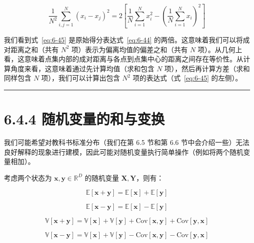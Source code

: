 \begin{equation}
\frac{1}{N^2} \sum_{i,j=1}^N (x_i - x_j)^2 = 2 \left[ \frac{1}{N} \sum_{i=1}^N x_i^2 - \left( \frac{1}{N} \sum_{i=1}^N x_i \right)^2 \right]
\tag{6.45}\label{eq:6-45}
\end{equation}

我们看到式~\eqref{eq:6-45} 是原始得分表达式~\eqref{eq:6-44} 的两倍。这意味着我们可以将成对距离之和（共有 $ N^2 $ 项）表示为偏离均值的偏差之和（共有 $ N $ 项）。从几何上看，这意味着点集内部的成对距离与各点到点集中心的距离之间存在等价性。从计算角度来看，这意味着通过先计算均值（求和包含 $ N $ 项），然后再计算方差（求和同样包含 $ N $ 项），我们可以计算出包含 $ N^2 $ 项的表达式（式~\eqref{eq:6-45} 的左侧）。

\medskip\hrule\medskip

\section*{6.4.4 随机变量的和与变换}

我们可能希望对教科书标准分布（我们在第 6.5 节和第 6.6 节中会介绍一些）无法良好解释的现象进行建模，因此可能对随机变量执行简单操作（例如将两个随机变量相加）。

考虑两个状态为 $ \boldsymbol{x}, \boldsymbol{y} \in \mathbb{R}^D $ 的随机变量 $ \boldsymbol{X}, \boldsymbol{Y} $，则有：

\begin{equation}
\mathbb{E}[\boldsymbol{x} + \boldsymbol{y}] = \mathbb{E}[\boldsymbol{x}] + \mathbb{E}[\boldsymbol{y}]
\tag{6.46}\label{eq:6-46}
\end{equation}

\begin{equation}
\mathbb{E}[\boldsymbol{x} - \boldsymbol{y}] = \mathbb{E}[\boldsymbol{x}] - \mathbb{E}[\boldsymbol{y}]
\tag{6.47}\label{eq:6-47}
\end{equation}

\begin{equation}
\mathbb{V}[\boldsymbol{x} + \boldsymbol{y}] = \mathbb{V}[\boldsymbol{x}] + \mathbb{V}[\boldsymbol{y}] + \mathrm{Cov}[\boldsymbol{x}, \boldsymbol{y}] + \mathrm{Cov}[\boldsymbol{y}, \boldsymbol{x}]
\tag{6.48}\label{eq:6-48}
\end{equation}

\begin{equation}
\mathbb{V}[\boldsymbol{x} - \boldsymbol{y}] = \mathbb{V}[\boldsymbol{x}] + \mathbb{V}[\boldsymbol{y}] - \mathrm{Cov}[\boldsymbol{x}, \boldsymbol{y}] - \mathrm{Cov}[\boldsymbol{y}, \boldsymbol{x}]
\tag{6.49}\label{eq:6-49}
\end{equation}

